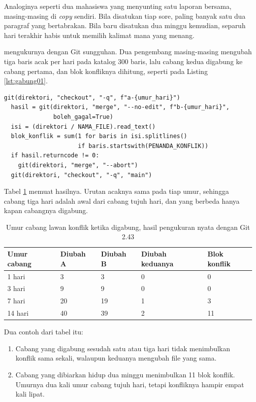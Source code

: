 Analoginya seperti dua mahasiswa yang menyunting satu laporan bersama,
masing-masing di \textit{copy} sendiri. Bila disatukan tiap sore, paling
banyak satu dua paragraf yang bertabrakan. Bila baru disatukan dua minggu
kemudian, separuh hari terakhir habis untuk memilih kalimat mana yang menang.

 mengukurnya dengan Git sungguhan. Dua pengembang
masing-masing mengubah tiga baris acak per hari pada katalog 300 baris, lalu
cabang kedua digabung ke cabang pertama, dan blok konfliknya dihitung, seperti
pada Listing \ref{lst:gabung01}.

\begin{lstlisting}[style=PythonStyle, caption={Menggabungkan dua cabang lalu menghitung blok konflik, tersedia di \berkas{sources/chapter01/simulasi-cabang.py}}, label={lst:gabung01}]
  git(direktori, "checkout", "-q", f"a-{umur_hari}")
  hasil = git(direktori, "merge", "--no-edit", f"b-{umur_hari}",
              boleh_gagal=True)
  isi = (direktori / NAMA_FILE).read_text()
  blok_konflik = sum(1 for baris in isi.splitlines()
                     if baris.startswith(PENANDA_KONFLIK))
  if hasil.returncode != 0:
    git(direktori, "merge", "--abort")
  git(direktori, "checkout", "-q", "main")
\end{lstlisting}

Tabel \ref{tab:cabang01} memuat hasilnya. Urutan acaknya sama pada tiap umur,
sehingga cabang tiga hari adalah awal dari cabang tujuh hari, dan yang berbeda
hanya kapan cabangnya digabung.

\begin{table}[!htb]
  \centering
  \caption{Umur cabang lawan konflik ketika digabung, hasil pengukuran nyata
           dengan Git 2.43}
  \label{tab:cabang01}
  \begin{tabularx}{\textwidth}{Xllll}
    \hline
    \textbf{Umur cabang} & \textbf{Diubah A} & \textbf{Diubah B} & \textbf{Diubah keduanya} & \textbf{Blok konflik} \\
    \hline
    1 hari & 3 & 3 & 0 & 0 \\
    \hline
    3 hari & 9 & 9 & 0 & 0 \\
    \hline
    7 hari & 20 & 19 & 1 & 3 \\
    \hline
    14 hari & 40 & 39 & 2 & 11 \\
    \hline
  \end{tabularx}
\end{table}

Dua contoh dari tabel itu:
\begin{enumerate}
  \item Cabang yang digabung sesudah satu atau tiga hari tidak menimbulkan
        konflik sama sekali, walaupun keduanya mengubah file yang sama.
  \item Cabang yang dibiarkan hidup dua minggu menimbulkan 11 blok konflik.
        Umurnya dua kali umur cabang tujuh hari, tetapi konfliknya hampir
        empat kali lipat.
\end{enumerate}

